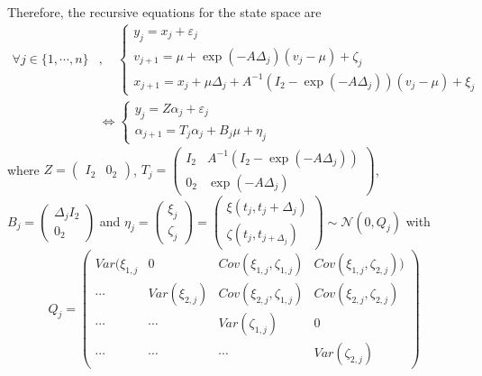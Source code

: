 \documentclass[11pt]{article}
\newcommand {\1}{\mathbb{1}}
\begin{document}
Therefore, the recursive equations for the state space are
\begin{align*}
	\forall j \in \{1, \cdots, n\}&, \quad 
	\left\{ \begin{array}{l}
		y_j=x_j+\varepsilon_j \\
		v_{j+1}=\mu +\exp(-A\Delta_j)(v_j-\mu)+\zeta_j \\
		x_{j+1}=x_j+\mu \Delta_j+A^{-1}(I_2-\exp(-A\Delta_j))(v_j-\mu)+\xi_j
	\end{array}\right. \\
	&\Leftrightarrow \left\{ \begin{array}{l}
		y_j=Z\alpha_j+\varepsilon_j \\
		\alpha_{j+1}=T_j \alpha_j+B_j \mu + \eta_j
	\end{array}\right.
\end{align*}
where $Z=\begin{pmatrix} I_2 & 0_2 \end{pmatrix}$, $T_j=\begin{pmatrix} I_2 & A^{-1}(I_2-\exp(-A\Delta_j)) \\
	0_2 & \exp(-A\Delta_j) \end{pmatrix}$, $B_j=\begin{pmatrix}
	\Delta_j I_2 \\
	0_2 \end{pmatrix}$ and $\eta_j=\begin{pmatrix} \xi_j \\ \zeta_j\end{pmatrix}=\begin{pmatrix} \xi(t_j,t_j+\Delta_j) \\ \zeta(t_j,t_{j+\Delta_j})\end{pmatrix} \sim \mathcal{N}(0,Q_j)$ with 
\[Q_j=\begin{pmatrix} 
	Var(\xi_{1,j} & 0 & Cov(\xi_{1,j},\zeta_{1,j}) & Cov(\xi_{1,j},\zeta_{2,j})) \\
	\cdots & Var(\xi_{2,j}) & Cov(\xi_{2,j}, \zeta_{1,j}) & Cov(\xi_{2,j},\zeta_{2,j}) \\
	\cdots & \cdots & Var(\zeta_{1,j}) & 0 \\
	\cdots & \cdots & \cdots & Var(\zeta_{2,j}) 
\end{pmatrix}\] 
\end{document}
